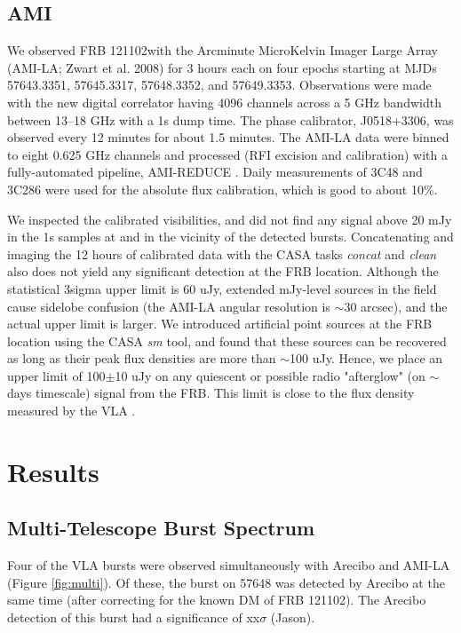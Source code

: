 \documentclass[twocolumn]{aastex61}
\newcommand{\frb}{FRB 121102}
\begin{document}
\subsection{AMI}

We observed \frb with the Arcminute MicroKelvin Imager Large Array (AMI-LA; Zwart et al. 2008) for 3 hours each on four epochs starting at MJDs 57643.3351, 57645.3317, 57648.3352, and 57649.3353. Observations were made with the new digital correlator having 4096 channels across a 5 GHz bandwidth between 13--18 GHz with a 1s dump time. The phase calibrator, J0518+3306, was observed every 12 minutes for about 1.5 minutes. The AMI-LA data were binned to eight 0.625 GHz channels and processed (RFI excision and calibration) with a fully-automated pipeline, AMI-REDUCE \citep[e.g.,][]{2013MNRAS.429.3330P}. Daily measurements of 3C48 and 3C286 were used for the absolute flux calibration, which is good to about 10\%. 

We inspected the calibrated visibilities, and did not find any signal above 20 mJy in the 1s samples at and in the vicinity of the detected bursts. Concatenating and imaging the 12 hours of calibrated data with the CASA tasks {\it concat} and {\it clean} also does not yield any significant detection at the FRB location. Although the statistical 3sigma upper limit is 60 uJy, extended mJy-level sources in the field cause sidelobe confusion (the AMI-LA angular resolution is $\sim$30 arcsec), and the actual upper limit is larger. We introduced artificial point sources at the FRB location using the CASA {\it sm} tool, and found that these sources can be recovered as long as their peak flux densities are more than $\sim$100 uJy. Hence, we place an upper limit of 100$\pm$10 uJy on any quiescent or possible radio "afterglow" (on $\sim$days timescale) signal from the FRB. This limit is close to the flux density measured by the VLA \citep{LOC}.

\section{Results}

\subsection{Multi-Telescope Burst Spectrum}
Four of the VLA bursts were observed simultaneously with Arecibo and AMI-LA (Figure \ref{fig:multi}). Of these, the burst on 57648 was detected by Arecibo at the same time (after correcting for the known DM of \frb). The Arecibo detection of this burst had a significance of {\color{red} xx$\sigma$ (Jason)}.
\end{document}
